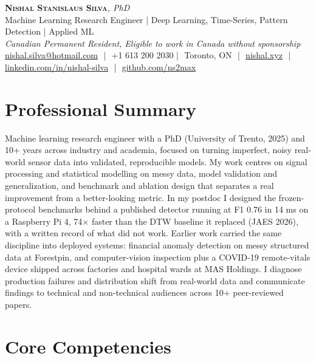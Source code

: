 \documentclass[11pt]{article}
\makeatletter
\newcommand{\cvName}{Nishal Stanislaus Silva}
\newcommand{\cvEmail}{nishal.silva@hotmail.com}
\newcommand{\cvPhone}{+1 613 200 2030}
\newcommand{\cvCity}{Toronto, ON}
\newcommand{\cvSite}{https://nishal.xyz}
\newcommand{\cvLinkedIn}{https://www.linkedin.com/in/nishal-silva}
\newcommand{\cvGitHub}{https://github.com/ns2max}
\newcommand{\cvStatus}{Canadian Permanent Resident, Eligible to work in Canada without sponsorship}
\newcommand{\cvTagline}{Machine Learning Research Engineer | Deep Learning, Time-Series, Pattern Detection | Applied ML}
\makeatother
\begin{document}
\pagestyle{empty}
\begin{center}
    {\LARGE \scshape \textbf{\cvName}}{\large \textit{, PhD}}\\[1pt]
    {\small \cvTagline}\\[1pt]
    {\footnotesize\textit{\cvStatus}}\\[1pt]
    {\small
    \href{mailto:\cvEmail}{\cvEmail} \,\,|\,\, \cvPhone \,\,|\,\, \cvCity
    \,\,|\,\, \href{\cvSite}{nishal.xyz} \,\,|\,\, \href{\cvLinkedIn}{linkedin.com/in/nishal-silva}
    \,\,|\,\, \href{\cvGitHub}{github.com/ns2max}}
\end{center}

\section*{Professional Summary}

Machine learning research engineer with a PhD (University of Trento, 2025) and 10+ years across industry and academia, focused on turning imperfect, noisy real-world sensor data into validated, reproducible models. My work centres on signal processing and statistical modelling on messy data, model validation and generalization, and benchmark and ablation design that separates a real improvement from a better-looking metric. In my postdoc I designed the frozen-protocol benchmarks behind a published detector running at F1 0.76 in 14 ms on a Raspberry Pi 4, 74$\times$ faster than the DTW baseline it replaced (JAES 2026), with a written record of what did not work. Earlier work carried the same discipline into deployed systems: financial anomaly detection on messy structured data at Forestpin, and computer-vision inspection plus a COVID-19 remote-vitals device shipped across factories and hospital wards at MAS Holdings. I diagnose production failures and distribution shift from real-world data and communicate findings to technical and non-technical audiences across 10+ peer-reviewed papers.

\section*{Core Competencies}
\end{document}

